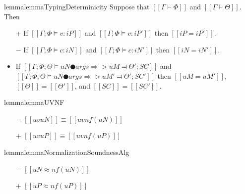 \begin{restatable}{lemma}{lemmaTypingDeterminicity}
    \label{lemma:typing-determinicity}
    Suppose that $[[Γ ⊢ Φ]]$ and $[[Γ ⊢ Θ]]$. Then 
    \begin{itemize}
        \item [$+$] If $[[Γ; Φ ⊨ v : iP]]$ and $[[Γ; Φ ⊨ v : iP']]$ then $[[iP = iP']]$.
        \item [$-$] If $[[Γ; Φ ⊨ c : iN]]$ and $[[Γ; Φ ⊨ c : iN']]$ then $[[iN = iN']]$.
        \item If $[[Γ; Φ; Θ ⊨ uN ● args ⇒> uM ⫤ Θ'; SC]]$ and 
            $[[Γ; Φ; Θ ⊨ uN ● args ⇒> uM' ⫤ Θ'; SC']]$ then 
            $[[uM = uM']]$, $[[Θ]] = [[Θ']]$, and $[[SC]] =[[SC']]$.  
    \end{itemize}
\end{restatable}

\begin{restatable}{lemma}{lemmaUVNF}
    \label{lemma:uv-nf}
    \hfill\\
    \begin{itemize}
    \item[$-$] $[[uv uN]] \equiv [[uv nf(uN)]]$
    \item[$+$] $[[uv uP]] \equiv [[uv nf(uP)]]$
    \end{itemize}
\end{restatable}

\begin{restatable}{lemma}{lemmaNormalizationSoundnessAlg}
    \label{lemma:normalization-soundness-alg}
    \hfill
    \begin{itemize}
        \item[$-$] $[[uN ≈ nf(uN)]]$
        \item[$+$] $[[uP ≈ nf(uP)]]$
    \end{itemize}
\end{restatable}
